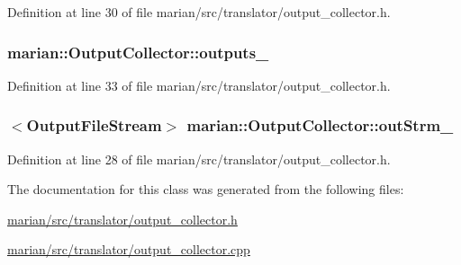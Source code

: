 Definition at line 30 of file marian/src/translator/output\+\_\+collector.\+h.

\subsubsection[{\texorpdfstring{outputs\+\_\+}{outputs_}}]{ marian\+::\+Output\+Collector\+::outputs\+\_\+\hspace{0.3cm}{\ttfamily [protected]}}\hypertarget{classmarian_1_1OutputCollector_a58dc9b7a62760be77669cd7ad612668e}{}\label{classmarian_1_1OutputCollector_a58dc9b7a62760be77669cd7ad612668e}


Definition at line 33 of file marian/src/translator/output\+\_\+collector.\+h.

\subsubsection[{\texorpdfstring{out\+Strm\+\_\+}{outStrm_}}]{$<${\bf Output\+File\+Stream}$>$ marian\+::\+Output\+Collector\+::out\+Strm\+\_\+\hspace{0.3cm}{\ttfamily [protected]}}\hypertarget{classmarian_1_1OutputCollector_a09fede155203845f26bf55be5d38e009}{}\label{classmarian_1_1OutputCollector_a09fede155203845f26bf55be5d38e009}


Definition at line 28 of file marian/src/translator/output\+\_\+collector.\+h.



The documentation for this class was generated from the following files\+:\begin{DoxyCompactItemize}
\item 
\hyperlink{marian_2src_2translator_2output__collector_8h}{marian/src/translator/output\+\_\+collector.\+h}\item 
\hyperlink{marian_2src_2translator_2output__collector_8cpp}{marian/src/translator/output\+\_\+collector.\+cpp}\end{DoxyCompactItemize}
